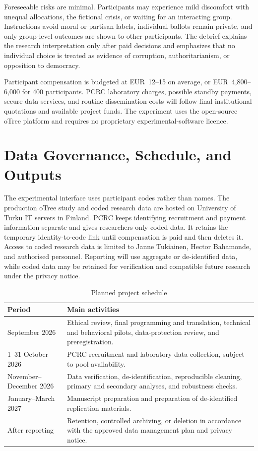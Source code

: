 \documentclass[11pt,a4paper]{article}
\begin{document}
Foreseeable risks are minimal. Participants may experience mild discomfort with unequal allocations, the fictional crisis, or waiting for an interacting group. Instructions avoid moral or partisan labels, individual ballots remain private, and only group-level outcomes are shown to other participants. The debrief explains the research interpretation only after paid decisions and emphasizes that no individual choice is treated as evidence of corruption, authoritarianism, or opposition to democracy.

Participant compensation is budgeted at EUR~12--15 on average, or EUR~4,800--6,000 for 400 participants. PCRC laboratory charges, possible standby payments, secure data services, and routine dissemination costs will follow final institutional quotations and available project funds. The experiment uses the open-source oTree platform and requires no proprietary experimental-software licence.

\section{Data Governance, Schedule, and Outputs}

The experimental interface uses participant codes rather than names. The production oTree study and coded research data are hosted on University of Turku IT servers in Finland. PCRC keeps identifying recruitment and payment information separate and gives researchers only coded data. It retains the temporary identity-to-code link until compensation is paid and then deletes it. Access to coded research data is limited to Janne Tukiainen, Hector Bahamonde, and authorised personnel. Reporting will use aggregate or de-identified data, while coded data may be retained for verification and compatible future research under the privacy notice.

\begin{table}[H]
\centering
\caption{Planned project schedule}
\begin{tabularx}{0.92\textwidth}{@{}L{0.24\textwidth}X@{}}
\toprule
Period & Main activities \\
\midrule
September 2026 & Ethical review, final programming and translation, technical and behavioral pilots, data-protection review, and preregistration. \\
1--31 October 2026 & PCRC recruitment and laboratory data collection, subject to pool availability. \\
November--December 2026 & Data verification, de-identification, reproducible cleaning, primary and secondary analyses, and robustness checks. \\
January--March 2027 & Manuscript preparation and preparation of de-identified replication materials. \\
After reporting & Retention, controlled archiving, or deletion in accordance with the approved data management plan and privacy notice. \\
\bottomrule
\end{tabularx}
\end{table}
\end{document}
